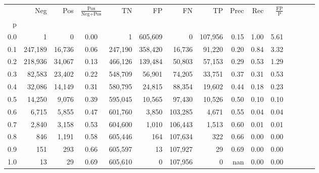 \begin{tabular}{rrrcrrrrrrrrrrr}
\toprule
{} &      Neg &     Pos & $\frac{\text{Pos}}{\text{Neg}+\text{Pos}}$ &       TN &       FP &       FN &       TP &  Prec &   Rec & $\frac{\text{FP}}{\text{P}}$ \\
p   &          &         &                                            &          &          &          &          &       &       &                              \\
\midrule
0.0 &        1 &       0 &                                       0.00 &        1 &  605,609 &        0 &  107,956 &  0.15 &  1.00 &                         5.61 \\
0.1 &  247,189 &  16,736 &                                       0.06 &  247,190 &  358,420 &   16,736 &   91,220 &  0.20 &  0.84 &                         3.32 \\
0.2 &  218,936 &  34,067 &                                       0.13 &  466,126 &  139,484 &   50,803 &   57,153 &  0.29 &  0.53 &                         1.29 \\
0.3 &   82,583 &  23,402 &                                       0.22 &  548,709 &   56,901 &   74,205 &   33,751 &  0.37 &  0.31 &                         0.53 \\
0.4 &   32,086 &  14,149 &                                       0.31 &  580,795 &   24,815 &   88,354 &   19,602 &  0.44 &  0.18 &                         0.23 \\
0.5 &   14,250 &   9,076 &                                       0.39 &  595,045 &   10,565 &   97,430 &   10,526 &  0.50 &  0.10 &                         0.10 \\
0.6 &    6,715 &   5,855 &                                       0.47 &  601,760 &    3,850 &  103,285 &    4,671 &  0.55 &  0.04 &                         0.04 \\
0.7 &    2,840 &   3,158 &                                       0.53 &  604,600 &    1,010 &  106,443 &    1,513 &  0.60 &  0.01 &                         0.01 \\
0.8 &      846 &   1,191 &                                       0.58 &  605,446 &      164 &  107,634 &      322 &  0.66 &  0.00 &                         0.00 \\
0.9 &      151 &     293 &                                       0.66 &  605,597 &       13 &  107,927 &       29 &  0.69 &  0.00 &                         0.00 \\
1.0 &       13 &      29 &                                       0.69 &  605,610 &        0 &  107,956 &        0 &   nan &  0.00 &                         0.00 \\
\bottomrule
\end{tabular}
